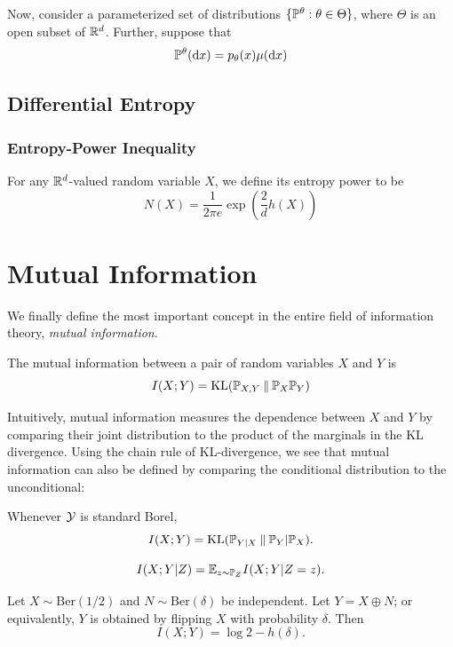 Now, consider a parameterized set of distributions $\{\mathbb{P}^\theta:\theta\in\Theta\}$, where $\Theta$ is an open subset of $\mathbb{R}^d$.
Further, suppose that 
\[\mathbb{P}^\theta(\mathrm{d} x)=p_\theta(x)\mu(\mathrm{d} x)\]
\subsection{Differential Entropy}

\subsubsection{Entropy-Power Inequality}
For any $\mathbb{R}^d$-valued random variable $X$, we define its entropy power to be
\[N(X)=\frac{1}{2\pi e}\exp\left(\frac{2}{d}h(X)\right)\]


\section{Mutual Information}
We finally define the most important concept in the entire field of information theory, \textit{mutual information}.
\begin{definition}
    The mutual information between a pair of random variables $X$ and $Y$ is
    \[I(X;Y)=\operatorname{KL}(\mathbb{P}_{X,Y}\mathbin{\|} \mathbb{P}_X\mathbb{P}_Y)\]
\end{definition}
Intuitively, mutual information measures the dependence between $X$ and $Y$ by comparing their joint distribution to the product of the marginals in the KL divergence.
Using the chain rule of KL-divergence, we see that mutual information can also be defined by comparing the conditional distribution to the unconditional:
\begin{proposition}
    Whenever $\mathcal{Y}$ is standard Borel,
    \begin{equation}\label{eq:mutual-information-conditional-divergence}
        I(X;Y)=\operatorname{KL}(\mathbb{P}_{Y|X}\mathbin{\|} \mathbb{P}_Y|\mathbb{P}_X).
    \end{equation}
\end{proposition}

\begin{definition}
    \[I(X;Y|Z)=\mathbb{E}_{z\sim \mathbb{P}_Z}I(X;Y|Z=z).\]
\end{definition}


\begin{example}
    Let $X\sim\text{Ber}(1/2)$ and $N\sim\text{Ber}(\delta)$ be independent.
    Let $Y=X\oplus N$; or equivalently, $Y$ is obtained by flipping $X$ with probability $\delta$.
    Then 
    \[I(X;Y)=\log 2 - h(\delta).\]
\end{example}



